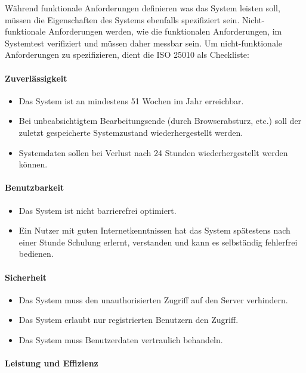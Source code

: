 Während funktionale Anforderungen definieren was das System leisten soll,
müssen die Eigenschaften des Systems ebenfalls spezifiziert sein.
Nicht-funktionale Anforderungen werden, wie die funktionalen Anforderungen, im
Systemtest verifiziert und müssen daher messbar sein.
Um nicht-funktionale Anforderungen zu spezifizieren,
dient die ISO 25010 als Checkliste:

\paragraph{Zuverlässigkeit}

\begin{itemize}
  \item Das System ist an mindestens 51 Wochen im Jahr erreichbar.
  \item Bei unbeabsichtigtem Bearbeitungsende (durch Browserabsturz, etc.) soll der zuletzt gespeicherte Systemzustand wiederhergestellt werden.
  \item Systemdaten sollen bei Verlust nach 24 Stunden wiederhergestellt werden können.
\end{itemize}

\paragraph{Benutzbarkeit}

\begin{itemize}
  \item Das System ist nicht barrierefrei optimiert.
  \item Ein Nutzer mit guten Internetkenntnissen hat das System spätestens nach einer Stunde Schulung erlernt, verstanden und kann es selbständig fehlerfrei bedienen.
\end{itemize}

\paragraph{Sicherheit}

\begin{itemize}
  \item Das System muss den unauthorisierten Zugriff auf den Server verhindern.
  \item Das System erlaubt nur registrierten Benutzern den Zugriff.
  \item Das System muss Benutzerdaten vertraulich behandeln.
\end{itemize}

\paragraph{Leistung und Effizienz}

